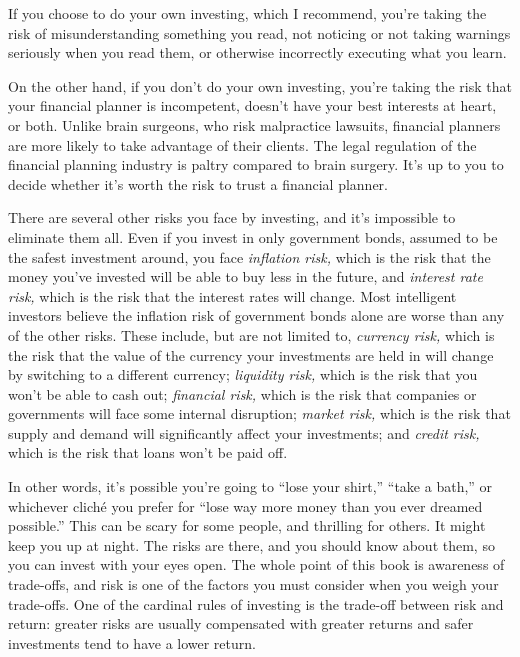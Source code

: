 If you choose to do your own investing, which I recommend, you're taking the risk of misunderstanding something you read, not noticing or not taking warnings seriously when you read them, or otherwise incorrectly executing what you learn.

On the other hand, if you don't do your own investing, you're taking the risk that your financial planner is incompetent, doesn't have your best interests at heart, or both. Unlike brain surgeons, who risk malpractice lawsuits, financial planners are more likely to take advantage of their clients. The legal regulation of the financial planning industry is paltry compared to brain surgery. It's up to you to decide whether it's worth the risk to trust a financial planner.

There are several other risks you face by investing, and it's impossible to eliminate them all. Even if you invest in only government bonds, assumed to be the safest investment around, you face \emph{inflation risk,} which is the risk that the money you've invested will be able to buy less in the future, and \emph{interest rate risk,} which is the risk that the interest rates will change. Most intelligent investors believe the inflation risk of government bonds alone are worse than any of the other risks. These include, but are not limited to, \emph{currency risk,} which is the risk that the value of the currency your investments are held in will change by switching to a different currency; \emph{liquidity risk,} which is the risk that you won't be able to cash out; \emph{financial risk,} which is the risk that companies or governments will face some internal disruption; \emph{market risk,} which is the risk that supply and demand will significantly affect your investments; and \emph{credit risk,} which is the risk that loans won't be paid off.

In other words, it's possible you're going to ``lose your shirt,'' ``take a bath,'' or whichever clich\'e you prefer for ``lose way more money than you ever dreamed possible.'' This can be scary for some people, and thrilling for others. It might keep you up at night. The risks are there, and you should know about them, so you can invest with your eyes open. The whole point of this book is awareness of trade-offs, and risk is one of the factors you must consider when you weigh your trade-offs. One of the cardinal rules of investing is the trade-off between risk and return: greater risks are usually compensated with greater returns and safer investments tend to have a lower return.

